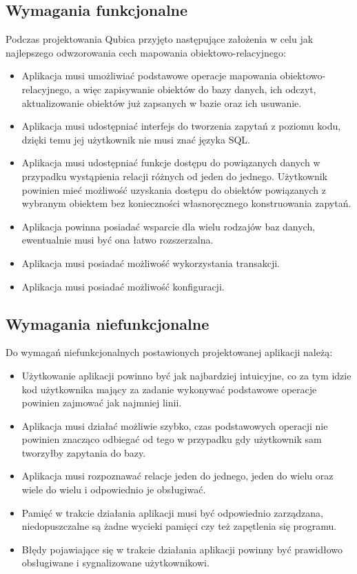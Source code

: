 \documentclass[12pt]{report}
\begin{document}
\subsection{Wymagania funkcjonalne}

Podczas projektowania Qubica przyjęto następujące założenia w celu jak najlepszego odwzorowania cech mapowania obiektowo-relacyjnego:

\begin{itemize}
\item Aplikacja musi umożliwiać podstawowe operacje mapowania obiektowo-rela\-cyjnego, a więc zapisywanie obiektów do bazy danych, ich odczyt, aktualizowanie obiektów
już zapsanych w bazie oraz ich usuwanie.
\item Aplikacja musi udostępniać interfejs do tworzenia zapytań z poziomu kodu, dzięki temu jej użytkownik nie musi znać języka SQL.
\item Aplikacja musi udostępniać funkcje dostępu do powiązanych danych w przypadku wystąpienia relacji różnych od jeden do jednego. Użytkownik powinien mieć możliwość
uzyskania dostępu do obiektów powiązanych z wybranym obiektem bez konieczności własnoręcznego konstruowania zapytań.
\item Aplikacja powinna posiadać wsparcie dla wielu rodzajów baz danych, ewentualnie musi być ona łatwo rozszerzalna.
\item Aplikacja musi posiadać możliwość wykorzystania transakcji.
\item Aplikacja musi posiadać możliwość konfiguracji.
\end{itemize}

\subsection{Wymagania niefunkcjonalne}

Do wymagań niefunkcjonalnych postawionych projektowanej aplikacji należą:

\begin{itemize}
\item Użytkowanie aplikacji powinno być jak najbardziej intuicyjne, co za tym idzie kod użytkownika mający za zadanie wykonywać podstawowe operacje powinien zajmować
jak najmniej linii.
\item Aplikacja musi działać możliwie szybko, czas podstawowych operacji nie powinien znacząco odbiegać od tego w przypadku gdy użytkownik sam two\-rzyłby zapytania do bazy.
\item Aplikacja musi rozpoznawać relacje jeden do jednego, jeden do wielu oraz wiele do wielu i odpowiednio je obsługiwać.
\item Pamięć w trakcie działania aplikacji musi być odpowiednio zarządzana, niedopuszczalne są żadne wycieki pamięci czy też zapętlenia się programu.
\item Błędy pojawiające się w trakcie działania aplikacji powinny być prawidłowo obsługiwane i sygnalizowane użytkownikowi.
\end{itemize}
\end{document}
